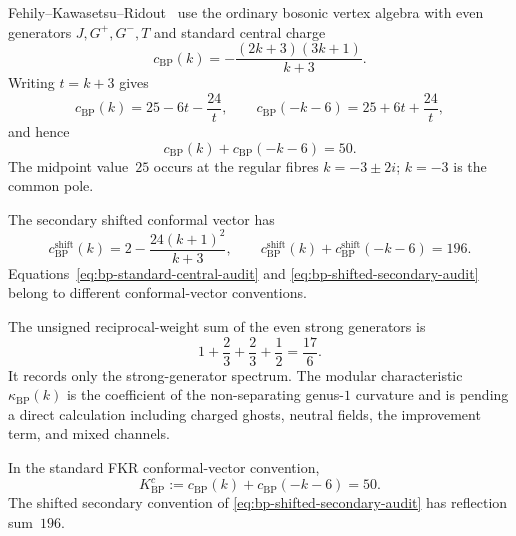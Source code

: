 \begin{computation}
\label{comp:bp-kappa-three-paths}
Fehily--Kawasetsu--Ridout~\cite[Definition~2.1 and
Eq.~\textup{(}2.2\textup{)}]{FKR20} use the ordinary bosonic vertex algebra
with even generators $J,G^+,G^-,T$ and standard central charge
\begin{equation}
\label{eq:bp-standard-central-audit}
c_{\mathrm{BP}}(k)
=-\frac{(2k+3)(3k+1)}{k+3}.
\end{equation}
Writing $t=k+3$ gives
\[
c_{\mathrm{BP}}(k)=25-6t-\frac{24}{t},
\qquad
c_{\mathrm{BP}}(-k-6)=25+6t+\frac{24}{t},
\]
and hence
\begin{equation}
\label{eq:bp-standard-conductor-audit}
c_{\mathrm{BP}}(k)+c_{\mathrm{BP}}(-k-6)=50.
\end{equation}
The midpoint value~$25$ occurs at the regular fibres $k=-3\pm2i$;
$k=-3$ is the common pole.

The secondary shifted conformal vector has
\begin{equation}
\label{eq:bp-shifted-secondary-audit}
c_{\mathrm{BP}}^{\mathrm{shift}}(k)
=2-\frac{24(k+1)^2}{k+3},
\qquad
c_{\mathrm{BP}}^{\mathrm{shift}}(k)
+c_{\mathrm{BP}}^{\mathrm{shift}}(-k-6)=196.
\end{equation}
Equations~\eqref{eq:bp-standard-central-audit} and
\eqref{eq:bp-shifted-secondary-audit} belong to different conformal-vector
conventions.

The unsigned reciprocal-weight sum of the even strong generators is
\[
1+\frac23+\frac23+\frac12=\frac{17}{6}.
\]
It records only the strong-generator spectrum.  The modular characteristic
$\kappa_{\mathrm{BP}}(k)$ is the coefficient of the non-separating genus-$1$
curvature and is \ClaimStatusOpen{} pending a direct calculation including
charged ghosts, neutral fields, the improvement term, and mixed channels.
\end{computation}

\begin{proposition}
\label{prop:bp-complementarity-constant}
In the standard FKR conformal-vector convention,
\[
K^c_{\mathrm{BP}}
:=c_{\mathrm{BP}}(k)+c_{\mathrm{BP}}(-k-6)=50.
\]
The shifted secondary convention of
\eqref{eq:bp-shifted-secondary-audit} has reflection sum~$196$.
\end{proposition}

